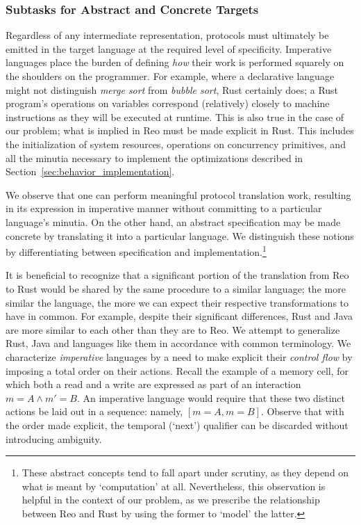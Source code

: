 \subsubsection{Subtasks for Abstract and Concrete Targets}
Regardless of any intermediate representation, protocols must ultimately be emitted in the target language at the required level of specificity. Imperative languages place the burden of defining \textit{how} their work is performed squarely on the shoulders on the programmer. For example, where a declarative language might not distinguish \textit{merge sort} from \textit{bubble sort}, Rust certainly does; a Rust program's operations on variables correspond (relatively) closely to machine instructions as they will be executed at runtime. This is also true in the case of our problem; what is implied in Reo must be made explicit in Rust. This includes the initialization of system resources, operations on concurrency primitives, and all the minutia necessary to implement the optimizations described in Section~\ref{sec:behavior_implementation}. 

We observe that one can perform meaningful protocol translation work, resulting in its expression in imperative manner without committing to a particular language's minutia. On the other hand, an abstract specification may be made concrete by translating it into a particular language. We distinguish these notions by differentiating between specification and implementation.\footnote{These abstract concepts tend to fall apart under scrutiny, as they depend on what is meant by `computation' at all. Nevertheless, this observation is helpful in the context of our problem, as we prescribe the relationship between Reo and Rust by using the former to `model' the latter.}  

It is beneficial to recognize that a significant portion of the translation from Reo to Rust would be shared by the same procedure to a similar language; the more similar the language, the more we can expect their respective transformations to have in common. For example, despite their significant differences, Rust and Java are more similar to each other than they are to Reo. We attempt to generalize Rust, Java and languages like them in accordance with common terminology. We characterize \textit{imperative} languages by a need to make explicit their \textit{control flow} by imposing a total order on their actions. Recall the example of a memory cell, for which both a read and a write are expressed as part of an interaction $m=A\wedge{}m'=B$. An imperative language would require that these two distinct actions be laid out in a sequence: namely, $[m=A, m=B]$. Observe that with the order made explicit, the temporal (`next') qualifier can be discarded without introducing ambiguity.

